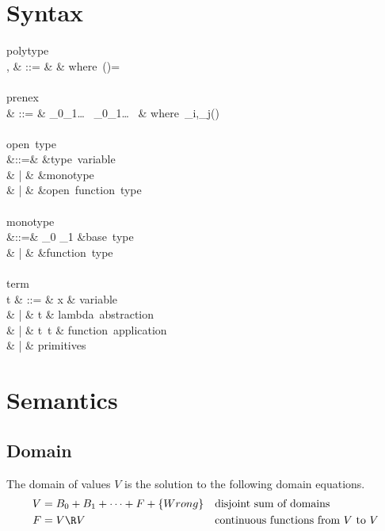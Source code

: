 \documentclass{amsart}
\theoremstyle{definition}
\begin{document}
\section{Syntax}

\begin{syntax}
\mbox{polytype}\\
\sigma, \tau & ::=
& \rho & \mbox{where }\FTV(\rho)=\emptyset
\\
\\
\mbox{prenex}\\
\rho & ::= &
\forall \alpha_0\alpha_1\ldots~
\exists \beta_0\beta_1\ldots~\theta
&
\mbox{where }\alpha_i,\beta_j\in\FTV(\theta)
\\
\\
\mbox{open type}\\
\theta
&::=& \alpha \Or \beta \Or \gamma \Or \cdots &\mbox{type variable}\\
& | & \mu &\mbox{monotype}\\
& | & \theta \R \theta &\mbox{open function type}
\\
\\
\mbox{monotype}\\
\mu
&::=& \iota_0 \Or \iota_1 \Or \cdots &\mbox{base type}\\
& | & \mu \R \mu &\mbox{function type}
\\
\\
\mbox{term}\\
t & ::= & x & \mbox{variable} \\
& | & t  & \mbox{lambda abstraction} \\
& | & t~t & \mbox{function application} \\
& | & \mbox{primitives}
\end{syntax}

\section{Semantics}

\subsection{Domain}
The domain of values $V$ is the solution to the following domain
equations.
\begin{align*}
V &= B_0 + B_1 + \cdots + F + \{Wrong\}
  &&\mbox{disjoint sum of domains}\\
F &= V \R V &&\mbox{continuous functions from $V$ to $V$}
\end{align*}
\end{document}
